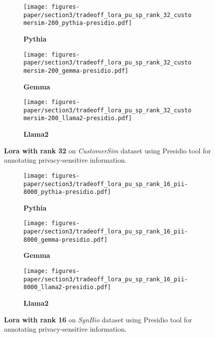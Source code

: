 \begin{figure}[h!]
    \centering
    \begin{subfigure}{0.48\linewidth}
    \centering
    \texttt{[image: figures-paper/section3/tradeoff\_lora\_pu\_sp\_rank\_32\_customersim-200\_pythia-presidio.pdf]}
    \caption{\textbf{Pythia}}
    \label{fig:appendix-lora32_csima}
    \end{subfigure}
    \begin{subfigure}{0.48\linewidth}
    \centering
    \texttt{[image: figures-paper/section3/tradeoff\_lora\_pu\_sp\_rank\_32\_customersim-200\_gemma-presidio.pdf]}
    \caption{\textbf{Gemma}}
    \label{fig:appendix-lora32_csimb}
    \end{subfigure}
    \begin{subfigure}{0.48\linewidth}
    \centering
    \texttt{[image: figures-paper/section3/tradeoff\_lora\_pu\_sp\_rank\_32\_customersim-200\_llama2-presidio.pdf]}
    \caption{\textbf{Llama2}}
    \label{fig:appendix-lora32_csimc}
    \end{subfigure}
    \caption{\textbf{Lora with rank 32} on \emph{CustomerSim} dataset using Presidio tool for annotating privacy-sensitive information.}
    \label{fig:appendix-lora32-csim}
\end{figure}


\begin{figure}[h!]
    \centering
    \begin{subfigure}{0.48\linewidth}
    \centering
    \texttt{[image: figures-paper/section3/tradeoff\_lora\_pu\_sp\_rank\_16\_pii-8000\_pythia-presidio.pdf]}
    \caption{\textbf{Pythia}}
    \label{fig:appendix-lora16_piia}
    \end{subfigure}
    \begin{subfigure}{0.48\linewidth}
    \centering
    \texttt{[image: figures-paper/section3/tradeoff\_lora\_pu\_sp\_rank\_16\_pii-8000\_gemma-presidio.pdf]}
    \caption{\textbf{Gemma}}
    \label{fig:appendix-lora16_piib}
    \end{subfigure}
    \begin{subfigure}{0.48\linewidth}
    \centering
    \texttt{[image: figures-paper/section3/tradeoff\_lora\_pu\_sp\_rank\_16\_pii-8000\_llama2-presidio.pdf]}
    \caption{\textbf{Llama2}}
    \label{fig:appendix-lora16_piic}
    \end{subfigure}
    \caption{\textbf{Lora with rank 16} on \emph{SynBio} dataset using Presidio tool for annotating privacy-sensitive information.}
    \label{fig:appendix-lora16-pii}
\end{figure}

